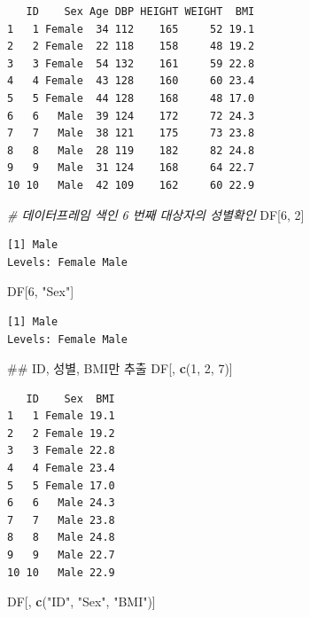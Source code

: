 \documentclass[11pt,a4paper]{book}
\newenvironment{Shaded}{\begin{snugshade}}{\end{snugshade}}
\newcommand{\KeywordTok}[1]{\textcolor[rgb]{0.13,0.29,0.53}{\textbf{#1}}}
\newcommand{\DecValTok}[1]{\textcolor[rgb]{0.00,0.00,0.81}{#1}}
\newcommand{\StringTok}[1]{\textcolor[rgb]{0.31,0.60,0.02}{#1}}
\newcommand{\CommentTok}[1]{\textcolor[rgb]{0.56,0.35,0.01}{\textit{#1}}}
\newcommand{\NormalTok}[1]{#1}
\theoremstyle{definition}
\theoremstyle{definition}
\theoremstyle{definition}
\theoremstyle{remark}
\begin{document}
\begin{verbatim}
   ID    Sex Age DBP HEIGHT WEIGHT  BMI
1   1 Female  34 112    165     52 19.1
2   2 Female  22 118    158     48 19.2
3   3 Female  54 132    161     59 22.8
4   4 Female  43 128    160     60 23.4
5   5 Female  44 128    168     48 17.0
6   6   Male  39 124    172     72 24.3
7   7   Male  38 121    175     73 23.8
8   8   Male  28 119    182     82 24.8
9   9   Male  31 124    168     64 22.7
10 10   Male  42 109    162     60 22.9
\end{verbatim}

\begin{Shaded}
\begin{Highlighting}[]
\CommentTok{# 데이터프레임 색인 6 번째 대상자의 성별확인}
\NormalTok{DF[}\DecValTok{6}\NormalTok{, }\DecValTok{2}\NormalTok{]}
\end{Highlighting}
\end{Shaded}

\begin{verbatim}
[1] Male
Levels: Female Male
\end{verbatim}

\begin{Shaded}
\begin{Highlighting}[]
\NormalTok{DF[}\DecValTok{6}\NormalTok{, }\StringTok{"Sex"}\NormalTok{]}
\end{Highlighting}
\end{Shaded}

\begin{verbatim}
[1] Male
Levels: Female Male
\end{verbatim}

\begin{Shaded}
\begin{Highlighting}[]
\NormalTok{## ID, 성별, BMI만 추출}
\NormalTok{DF[, }\KeywordTok{c}\NormalTok{(}\DecValTok{1}\NormalTok{, }\DecValTok{2}\NormalTok{, }\DecValTok{7}\NormalTok{)]}
\end{Highlighting}
\end{Shaded}

\begin{verbatim}
   ID    Sex  BMI
1   1 Female 19.1
2   2 Female 19.2
3   3 Female 22.8
4   4 Female 23.4
5   5 Female 17.0
6   6   Male 24.3
7   7   Male 23.8
8   8   Male 24.8
9   9   Male 22.7
10 10   Male 22.9
\end{verbatim}

\begin{Shaded}
\begin{Highlighting}[]
\NormalTok{DF[, }\KeywordTok{c}\NormalTok{(}\StringTok{"ID"}\NormalTok{, }\StringTok{"Sex"}\NormalTok{, }\StringTok{"BMI"}\NormalTok{)]}
\end{Highlighting}
\end{Shaded}
\end{document}
